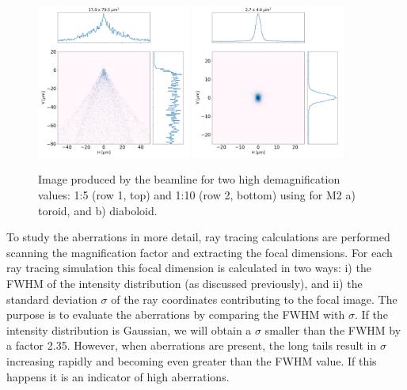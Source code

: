 \documentclass{iucr}              %
\begin{document}
\begin{figure}
\includegraphics[width=0.45\textwidth]{figures/M0p1_toroid.png}
\includegraphics[width=0.45\textwidth]{figures/M0p1_diaboloid.png}
\caption{
Image produced by the beamline for two high demagnification values: 1:5 (row 1, top) and 1:10 (row 2, bottom) using for M2 a) toroid, and b) diaboloid.}
\end{figure}


To study the aberrations in more detail, ray tracing calculations are performed scanning the magnification factor and extracting the focal dimensions. For each ray tracing simulation this focal dimension is calculated in two ways: i) the FWHM of the intensity distribution (as discussed previously), and ii) the standard deviation $\sigma$ of the ray coordinates contributing to the focal image. The purpose is to evaluate the aberrations by comparing the FWHM with $\sigma$. If the intensity distribution is Gaussian, we will obtain a $\sigma$ smaller than the FWHM by a factor 2.35. However, when aberrations are present, the long tails result in $\sigma$ increasing rapidly and becoming even greater than the FWHM value. If this happens it is an indicator of high aberrations.  
\end{document}
